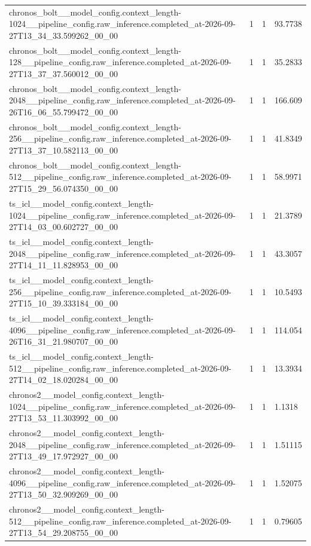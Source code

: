 \begin{tabular}{llll}
chronos\_bolt\_\_model\_config.context\_length-1024\_\_pipeline\_config.raw\_inference.completed\_at-2026-09-27T13\_34\_33.599262\_00\_00 & 1 & 1 & 93.7738 \\
chronos\_bolt\_\_model\_config.context\_length-128\_\_pipeline\_config.raw\_inference.completed\_at-2026-09-27T13\_37\_37.560012\_00\_00 & 1 & 1 & 35.2833 \\
chronos\_bolt\_\_model\_config.context\_length-2048\_\_pipeline\_config.raw\_inference.completed\_at-2026-09-26T16\_06\_55.799472\_00\_00 & 1 & 1 & 166.609 \\
chronos\_bolt\_\_model\_config.context\_length-256\_\_pipeline\_config.raw\_inference.completed\_at-2026-09-27T13\_37\_10.582113\_00\_00 & 1 & 1 & 41.8349 \\
chronos\_bolt\_\_model\_config.context\_length-512\_\_pipeline\_config.raw\_inference.completed\_at-2026-09-27T15\_29\_56.074350\_00\_00 & 1 & 1 & 58.9971 \\
ts\_icl\_\_model\_config.context\_length-1024\_\_pipeline\_config.raw\_inference.completed\_at-2026-09-27T14\_03\_00.602727\_00\_00 & 1 & 1 & 21.3789 \\
ts\_icl\_\_model\_config.context\_length-2048\_\_pipeline\_config.raw\_inference.completed\_at-2026-09-27T14\_11\_11.828953\_00\_00 & 1 & 1 & 43.3057 \\
ts\_icl\_\_model\_config.context\_length-256\_\_pipeline\_config.raw\_inference.completed\_at-2026-09-27T15\_10\_39.333184\_00\_00 & 1 & 1 & 10.5493 \\
ts\_icl\_\_model\_config.context\_length-4096\_\_pipeline\_config.raw\_inference.completed\_at-2026-09-26T16\_31\_21.980707\_00\_00 & 1 & 1 & 114.054 \\
ts\_icl\_\_model\_config.context\_length-512\_\_pipeline\_config.raw\_inference.completed\_at-2026-09-27T14\_02\_18.020284\_00\_00 & 1 & 1 & 13.3934 \\
chronos2\_\_model\_config.context\_length-1024\_\_pipeline\_config.raw\_inference.completed\_at-2026-09-27T13\_53\_11.303992\_00\_00 & 1 & 1 & 1.1318 \\
chronos2\_\_model\_config.context\_length-2048\_\_pipeline\_config.raw\_inference.completed\_at-2026-09-27T13\_49\_17.972927\_00\_00 & 1 & 1 & 1.51115 \\
chronos2\_\_model\_config.context\_length-4096\_\_pipeline\_config.raw\_inference.completed\_at-2026-09-27T13\_50\_32.909269\_00\_00 & 1 & 1 & 1.52075 \\
chronos2\_\_model\_config.context\_length-512\_\_pipeline\_config.raw\_inference.completed\_at-2026-09-27T13\_54\_29.208755\_00\_00 & 1 & 1 & 0.79605 \\

\end{tabular}
